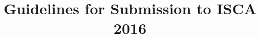 \documentclass{sig-alternate}
\title{Guidelines for Submission to ISCA 2016}
\author{}
\begin{document}
\maketitle
\thispagestyle{firstpage}
\pagestyle{plain}

\begin{abstract}



\end{abstract}









\end{document}
